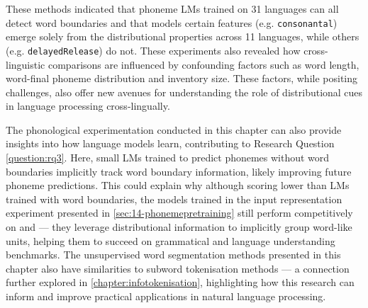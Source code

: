 These methods indicated that phoneme LMs trained on 31 languages can all detect word boundaries and that models certain features (e.g. \texttt{consonantal}) emerge solely from the distributional properties across 11 languages, while others (e.g. \texttt{delayedRelease}) do not. These experiments also revealed how cross-linguistic comparisons are influenced by confounding factors such as word length, word-final phoneme distribution and inventory size. These factors, while positing challenges, also offer new avenues for understanding the role of distributional cues in language processing cross-lingually.

The phonological experimentation conducted in this chapter can also provide insights into how language models learn, contributing to Research Question \ref{question:rq3}. Here, small LMs trained to predict phonemes without word boundaries implicitly track word boundary information, likely improving future phoneme predictions. This could explain why although scoring lower than LMs trained with word boundaries, the models trained in the input representation experiment presented in \cref{sec:14-phonemepretraining} still perform competitively on \blimp and \glue --- they leverage distributional information to implicitly group word-like units, helping them to succeed on grammatical and language understanding benchmarks. The unsupervised word segmentation methods presented in this chapter also have similarities to subword tokenisation methods --- a connection further explored in \cref{chapter:infotokenisation}, highlighting how this research can inform and improve practical applications in natural language processing.






